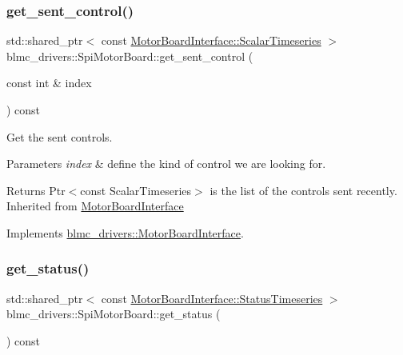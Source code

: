 \mbox{\label{classblmc__drivers_1_1SpiMotorBoard_af6e2b210a6746b82a01aa2f2b550d05d}} 
\subsubsection{\texorpdfstring{get\+\_\+sent\+\_\+control()}{get\_sent\_control()}}
{\footnotesize\ttfamily std\+::shared\+\_\+ptr$<$ const \hyperlink{classblmc__drivers_1_1MotorBoardInterface_a14e237254ba495a66091ea3a3a33fa75}{Motor\+Board\+Interface\+::\+Scalar\+Timeseries} $>$ blmc\+\_\+drivers\+::\+Spi\+Motor\+Board\+::get\+\_\+sent\+\_\+control (\begin{DoxyParamCaption}\item[{const int \&}]{index }\end{DoxyParamCaption}) const\hspace{0.3cm}{\ttfamily [virtual]}}



Get the sent controls. 


\begin{DoxyParams}{Parameters}
{\em index} & define the kind of control we are looking for. \\
\hline
\end{DoxyParams}
\begin{DoxyReturn}{Returns}
Ptr$<$const Scalar\+Timeseries$>$ is the list of the controls sent recently. Inherited from \hyperlink{classblmc__drivers_1_1MotorBoardInterface}{Motor\+Board\+Interface} 
\end{DoxyReturn}


Implements \hyperlink{classblmc__drivers_1_1MotorBoardInterface_a8dc6222e915fc96d89b13cbb0fcb0cda}{blmc\+\_\+drivers\+::\+Motor\+Board\+Interface}.

\mbox{\label{classblmc__drivers_1_1SpiMotorBoard_a2402ab8f55dce8c4bc35bae619e61e23}} 
\subsubsection{\texorpdfstring{get\+\_\+status()}{get\_status()}}
{\footnotesize\ttfamily std\+::shared\+\_\+ptr$<$ const \hyperlink{classblmc__drivers_1_1MotorBoardInterface_ae3777e484dda60c4abe87f2b542ddfb8}{Motor\+Board\+Interface\+::\+Status\+Timeseries} $>$ blmc\+\_\+drivers\+::\+Spi\+Motor\+Board\+::get\+\_\+status (\begin{DoxyParamCaption}{ }\end{DoxyParamCaption}) const\hspace{0.3cm}{\ttfamily [virtual]}}



